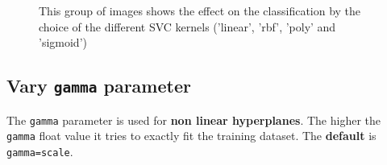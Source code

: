 \documentclass [oneside,10pt,a4paper,ngerman,BCOR10mm,headsepline,parindent,final]{scrartcl}
\begin{document}
    \begin{figure}
        \begin{center}\end{center}
        \caption{This group of images shows the effect on the classification by the choice of the different SVC kernels ('linear', 'rbf', 'poly' and 'sigmoid')}
        \label{fig:vary_kernels}
    \end{figure}
    
    \hypertarget{vary-gamma-parameter}{%
\subsection{\texorpdfstring{Vary \texttt{gamma}
parameter}{Vary gamma parameter}}\label{vary-gamma-parameter}}

The \texttt{gamma} parameter is used for \textbf{non linear
hyperplanes}. The higher the \texttt{gamma} float value it tries to
exactly fit the training dataset. The \textbf{default} is
\texttt{gamma=\textquotesingle{}scale\textquotesingle{}}.
\end{document}
